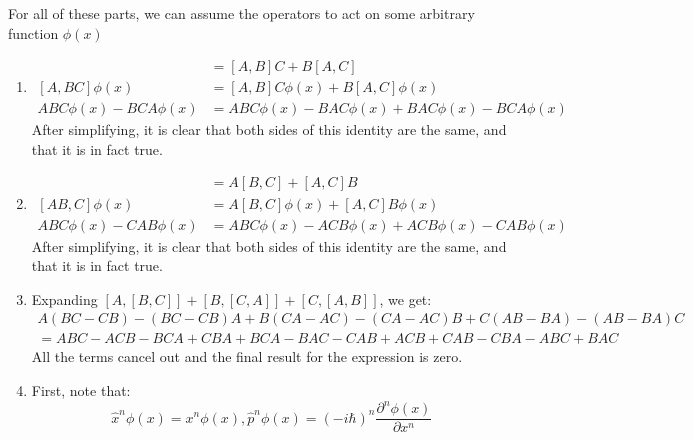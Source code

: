 \begin{sol}
For all of these parts, we can assume the operators to act on some arbitrary function $\phi(x)$
\begin{enumerate}[label=\textbf{(\alph*)}]
\item
\begin{align*}
[A, BC] &=  [A, B]C + B[A, C] \\
[A, BC]\phi(x) &= [A, B]C\phi(x) + B[A, C]\phi(x) \\
ABC\phi(x) - BCA\phi(x) &= ABC\phi(x) - BAC\phi(x) + BAC\phi(x) - BCA\phi(x)
\end{align*}
After simplifying, it is clear that both sides of this identity are the same, and that it is in fact true.
\item
\begin{align*}
	[AB, C] &= A[B, C] + [A, C]B \\
    [AB, C]\phi(x) &= A[B, C]\phi(x) + [A, C]B\phi(x) \\
    ABC\phi(x) - CAB\phi(x) &= ABC\phi(x) - ACB\phi(x) + ACB\phi(x) - CAB\phi(x)
\end{align*}
After simplifying, it is clear that both sides of this identity are the same, and that it is in fact true.
\item Expanding $[A, [B, C]] + [B, [C, A]] + [C, [A, B]]$, we get:
\begin{align*}
  A(BC - CB) - (BC - CB)A + B(CA - AC) - (CA - AC)B + C(AB - BA) - (AB - BA)C \\
   = ABC - ACB - BCA + CBA + BCA - BAC - CAB + ACB + CAB - CBA - ABC + BAC
\end{align*}
All the terms cancel out and the final result for the expression is zero.
\item First, note that:
$$\hat{x}^n\phi(x) = x^n\phi(x), \hat{p}^n\phi(x) = (-i\hbar)^n\frac{\partial^n\phi(x)}{\partial x^n}$$


\end{enumerate}
\end{sol}
